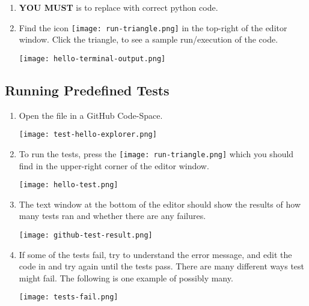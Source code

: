\begin{enumerate}
\item  \textbf{YOU MUST} is to replace  with correct python code.

\item Find the icon \texttt{[image: run-triangle.png]} in the
top-right of the editor window.  Click the triangle, to see a sample
run/execution of the code.

\noindent\texttt{[image: hello-terminal-output.png]}

\end{enumerate}

\subsection{Running Predefined Tests}
\label{sec.run.tests}
\begin{enumerate}


\item Open the file  in a GitHub Code-Space.

\noindent\texttt{[image: test-hello-explorer.png]}

\item To run the tests, press the
\texttt{[image: run-triangle.png]} which you should find in
the upper-right corner of the editor window.

\noindent\texttt{[image: hello-test.png]}


\item The text window at the bottom of the editor should show the results of
how many tests ran and whether there are any failures.

\noindent\texttt{[image: github-test-result.png]}

\item If some of the tests fail, try to understand the error message, and edit
  the code in  and try again until the tests pass.  There are many
  different ways test might fail.  The following is one example of possibly many.

\noindent\texttt{[image: tests-fail.png]}


\end{enumerate}

\clearpage

